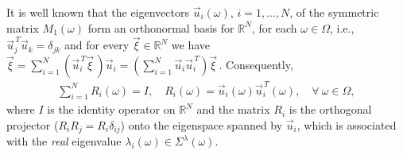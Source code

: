 \documentclass{cmslatex}
\begin{document}
It is well known \cite{Halmos-1958,Keener-2000} that the eigenvectors
$\vec{u}_i(\omega)$, $i=1,\ldots,N$, of the symmetric matrix $M_1(\omega)$ form an orthonormal
basis for $\mathbb{R}^N$, for each $\omega\in\Omega$, i.e., 
$\vec{u}_j^{\,T}\vec{u}_k=\delta_{jk}$  and for every
$\vec{\xi}\in\mathbb{R}^N$ we have
$\vec{\xi}=\sum_{i=1}^N(\vec{u}_i^{\,T}\vec{\xi}\,)\vec{u}_i  
=\left(\sum_{i=1}^N\vec{u}_i\vec{u}_i^{\,T}\right)\vec{\xi}\,$. Consequently,       
%
\begin{align}\label{eq:Matrix_Rep_Spec_Theorem}
  \sum_{i=1}^NR_i(\omega)=I, \quad
  R_i(\omega)=\vec{u}_i(\omega)\vec{u}_i^{\,T}(\omega),  \quad
  \forall \     \omega\in\Omega,
\end{align}
%
where $I$ is the identity operator on $\mathbb{R}^N$ and the matrix
$R_i$ is the orthogonal projector ($R_iR_j=R_i\delta_{ij}$) onto the
eigenspace spanned by $\vec{u}_i$, which is associated with the
\emph{real} eigenvalue $\lambda_i(\omega)\in\Sigma^\lambda(\omega)$. 
\end{document}
